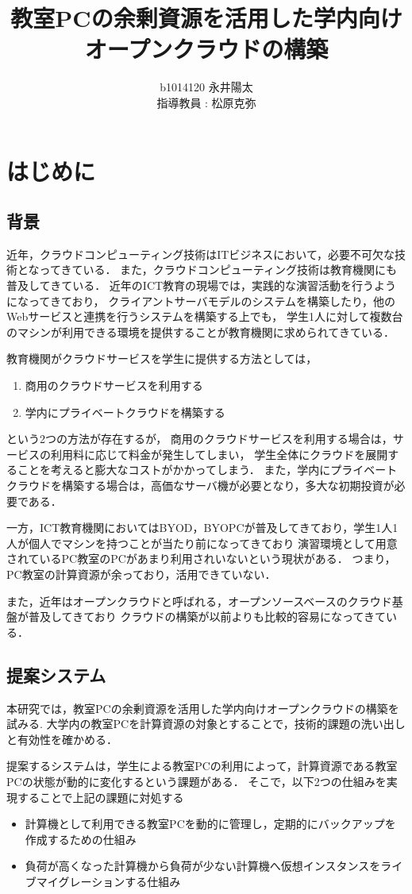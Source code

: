 \documentclass[11pt,a4paper]{jsarticle}
\author{%
b1014120 永井陽太\\指導教員 : 松原克弥
}
\title{教室PCの余剰資源を活用した学内向けオープンクラウドの構築}
\begin{document}
\maketitle

\section{はじめに}
\subsection{背景}
近年，クラウドコンピューティング技術はITビジネスにおいて，必要不可欠な技術となってきている．
また，クラウドコンピューティング技術は教育機関にも普及してきている\cite{SurveyOnActualStateOfAcademicInformationInfrastructure}．
近年のICT教育の現場では，実践的な演習活動を行うようになってきており，
クライアントサーバモデルのシステムを構築したり，他のWebサービスと連携を行うシステムを構築する上でも，
学生1人に対して複数台のマシンが利用できる環境を提供することが教育機関に求められてきている．
\par 教育機関がクラウドサービスを学生に提供する方法としては，
\begin{enumerate}
	\item 商用のクラウドサービスを利用する
	\item 学内にプライベートクラウドを構築する
\end{enumerate}
という2つの方法が存在するが，
商用のクラウドサービスを利用する場合は，サービスの利用料に応じて料金が発生してしまい，
学生全体にクラウドを展開することを考えると膨大なコストがかかってしまう．
また，学内にプライベートクラウドを構築する場合は，高価なサーバ機が必要となり，多大な初期投資が必要である．
\par 一方，ICT教育機関においてはBYOD，BYOPCが普及してきており，学生1人1人が個人でマシンを持つことが当たり前になってきており
演習環境として用意されているPC教室のPCがあまり利用されいないという現状がある．
つまり，PC教室の計算資源が余っており，活用できていない．
\par また，近年はオープンクラウドと呼ばれる，オープンソースベースのクラウド基盤が普及してきており
クラウドの構築が以前よりも比較的容易になってきている．

\subsection{提案システム}
本研究では，教室PCの余剰資源を活用した学内向けオープンクラウドの構築を試みる.
大学内の教室PCを計算資源の対象とすることで，技術的課題の洗い出しと有効性を確かめる．
\par 提案するシステムは，学生による教室PCの利用によって，計算資源である教室PCの状態が動的に変化するという課題がある．
そこで，以下2つの仕組みを実現することで上記の課題に対処する
\begin{itemize}
	\item 計算機として利用できる教室PCを動的に管理し，定期的にバックアップを作成するための仕組み
	\item 負荷が高くなった計算機から負荷が少ない計算機へ仮想インスタンスをライブマイグレーションする仕組み
\end{itemize}
\end{document}
